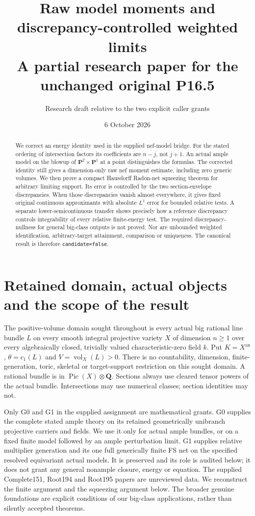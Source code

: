 \documentclass[10pt]{article}
\title{Raw model moments and discrepancy-controlled weighted limits\\
\large A partial research paper for the unchanged original P16.5}
\author{Research draft relative to the two explicit caller grants}
\date{6 October 2026}
\newcommand{\vol}{\operatorname{vol}}
\newcommand{\an}{\mathrm{an}}
\begin{document}
\maketitle
\begin{abstract}
We correct an energy identity used in the supplied nef-model bridge.
For the stated ordering of intersection factors its coefficients are
$n-j$, not $j+1$. An actual ample model on the blowup of
$\mathbf P^2\times\mathbf P^1$ at a point distinguishes the formulas.
The corrected identity still gives a dimension-only raw nef moment
estimate, including zero generic volumes. We then prove a compact
Hausdorff Radon-net squeezing theorem for arbitrary limiting support.
Its error is controlled by the two section-envelope discrepancies.
When those discrepancies vanish almost everywhere, it gives fixed
original continuous approximants with absolute $L^1$ error for bounded
relative tests. A separate lower-semicontinuous transfer shows precisely
how a reference discrepancy controls integrability of every relative
finite-energy test. The required discrepancy-nullness for general
big-class outputs is not proved. Nor are unbounded weighted
identification, arbitrary-target attainment, comparison or uniqueness.
The canonical result is therefore \texttt{candidate=false}.
\end{abstract}

\section{Retained domain, actual objects and the scope of the result}
The positive-volume domain sought throughout is every actual big rational
line bundle $L$ on every smooth integral projective variety $X$ of
dimension $n\geq1$ over every algebraically closed, trivially valued
characteristic-zero field $k$. Put $K=X^\an$, $\theta=c_1(L)$ and
$V=\vol_X(L)>0$. There is no countability, dimension, finite-generation,
toric, skeletal or target-support restriction on this sought domain.
A rational bundle is in $\operatorname{Pic}(X)\otimes\mathbf Q$.
Sections always use cleared tensor powers of the actual bundle.
Intersections may use numerical classes; section identities may not.

Only G0 and G1 in the supplied assignment are mathematical grants.
G0 supplies the complete stated ample theory on its retained
geometrically unibranch projective carriers and fields. We use it
only for actual ample bundles, or on a fixed finite model followed by
an ample perturbation limit. G1 supplies relative multiplier generation
and its one full generically finite FS net on the specified resolved
equivariant actual models. It is preserved and its role is audited below;
it does not grant any general nonample closure, energy or equation.
The supplied Complete151, Root194 and Root195 papers are unreviewed data.
We reconstruct the finite argument and the squeezing argument below.
The broader genuine foundations are explicit conditions of our
big-class applications, rather than silently accepted theorems.
\end{document}
